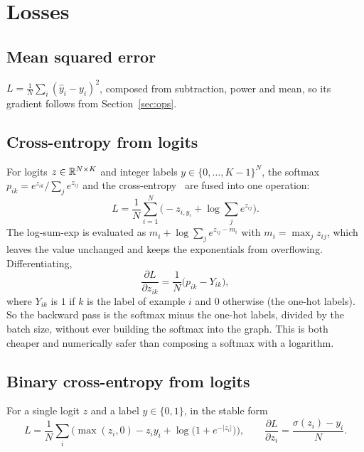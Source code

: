 \section{Losses}
\label{sec:losses}

\subsection{Mean squared error}
$L = \frac{1}{N}\sum_{i} (\hat y_i - y_i)^2$, composed from subtraction, power and mean, so its
gradient follows from Section~\ref{sec:ops}.

\subsection{Cross-entropy from logits}
For logits $z \in \mathbb{R}^{N\times K}$ and integer labels $y \in \{0,\dots,K-1\}^N$, the softmax
$p_{ik} = e^{z_{ik}} / \sum_j e^{z_{ij}}$ and the cross-entropy~\cite{upc-aa1} are fused into one operation:
\begin{equation}
  L = \frac{1}{N}\sum_{i=1}^{N}\Big(-z_{i,y_i} + \log\sum_{j} e^{z_{ij}}\Big).
\end{equation}
The log-sum-exp is evaluated as $m_i + \log\sum_j e^{z_{ij} - m_i}$ with $m_i = \max_j z_{ij}$, which
leaves the value unchanged and keeps the exponentials from overflowing. Differentiating,
\begin{equation}
  \frac{\partial L}{\partial z_{ik}} = \frac{1}{N}\big(p_{ik} - Y_{ik}\big),
\end{equation}
where $Y_{ik}$ is $1$ if $k$ is the label of example $i$ and $0$ otherwise (the one-hot labels). So
the backward pass is the softmax minus the one-hot labels, divided by the batch size, without
ever building the softmax into the graph. This is both cheaper and numerically safer than composing
a softmax with a logarithm.

\subsection{Binary cross-entropy from logits}
For a single logit $z$ and a label $y\in\{0,1\}$, in the stable form
\begin{equation}
  L = \frac{1}{N}\sum_i \Big(\max(z_i, 0) - z_i y_i + \log\big(1 + e^{-|z_i|}\big)\Big),
  \qquad \frac{\partial L}{\partial z_i} = \frac{\sigma(z_i) - y_i}{N}.
\end{equation}
